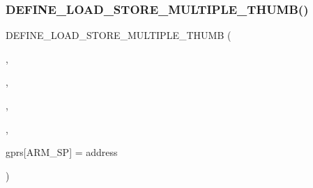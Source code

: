\subsubsection{\texorpdfstring{D\+E\+F\+I\+N\+E\+\_\+\+L\+O\+A\+D\+\_\+\+S\+T\+O\+R\+E\+\_\+\+M\+U\+L\+T\+I\+P\+L\+E\+\_\+\+T\+H\+U\+M\+B()}{DEFINE\_LOAD\_STORE\_MULTIPLE\_THUMB()}\hspace{0.1cm}{\footnotesize\ttfamily [2/3]}}
{\footnotesize\ttfamily D\+E\+F\+I\+N\+E\+\_\+\+L\+O\+A\+D\+\_\+\+S\+T\+O\+R\+E\+\_\+\+M\+U\+L\+T\+I\+P\+L\+E\+\_\+\+T\+H\+U\+MB (\begin{DoxyParamCaption}\item[{P\+OP}]{,  }\item[{\mbox{\hyperlink{isa-thumb_8c_acce42da2f3c8524d613be6906db2e0c9}{A\+R\+M\+\_\+\+SP}}}]{,  }\item[{\mbox{\hyperlink{pufftest_8c_a6e4d4615cece3375ac8c7b94a1ade4fa}{load}}}]{,  }\item[{\mbox{\hyperlink{isa-thumb_8c_a3048b70ae3e6d982e60f063bd78fda51}{IA}}}]{,  }\item[{\mbox{\hyperlink{isa-thumb_8c_a9438645a9cdcda0203c3769a4658e9b1}{T\+H\+U\+M\+B\+\_\+\+L\+O\+A\+D\+\_\+\+P\+O\+S\+T\+\_\+\+B\+O\+DY}};cpu-\/$>$}]{gprs\mbox{[}\+A\+R\+M\+\_\+\+S\+P\mbox{]} = {\ttfamily address} }\end{DoxyParamCaption})}

\mbox{\label{isa-thumb_8c_aac6a2731f586405d878c5fe797a12568}} 
